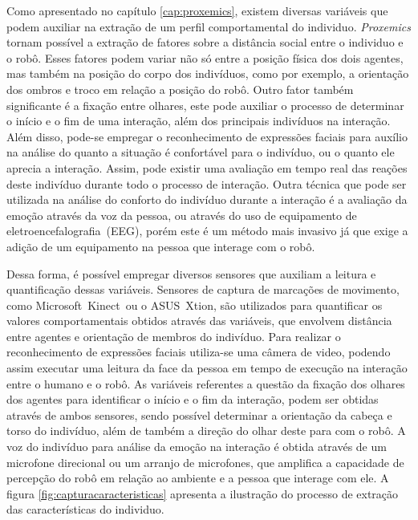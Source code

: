 Como apresentado no capítulo \ref{cap:proxemics}, existem diversas variáveis que podem auxiliar na extração de um perfil comportamental do individuo. \emph{Proxemics} tornam possível a extração de fatores sobre a distância social entre o individuo e o robô. Esses fatores podem variar não só entre a posição física dos dois agentes, mas também na posição do corpo dos indivíduos, como por exemplo, a orientação dos ombros e troco em relação a posição do robô. Outro fator também significante é a fixação entre olhares, este pode auxiliar o processo de determinar o início e o fim de uma interação, além dos principais indivíduos na interação. Além disso, pode-se empregar o reconhecimento de expressões faciais para auxílio na análise do quanto a situação é confortável para o indivíduo, ou o quanto ele aprecia a interação. Assim, pode existir uma avaliação em tempo real das reações deste indivíduo durante todo o processo de interação. Outra técnica que pode ser utilizada na análise do conforto do indivíduo durante a interação é a avaliação da emoção através da voz da pessoa, ou através do uso de equipamento de eletroencefalografia~(EEG), porém este é um método mais invasivo já que exige a adição de um equipamento na pessoa que interage com o robô.

Dessa forma, é possível empregar diversos sensores que auxiliam a leitura e quantificação dessas variáveis. Sensores de captura de marcações de movimento, como Microsoft\textregistered\ Kinect\textregistered\ ou o ASUS\textregistered\ Xtion\textregistered, são utilizados para quantificar os valores comportamentais obtidos através das variáveis, que envolvem distância entre agentes e orientação de membros do indivíduo. Para realizar o reconhecimento de expressões faciais utiliza-se uma câmera de video, podendo assim executar uma leitura da face da pessoa em tempo de execução na interação entre o humano e o robô. As variáveis referentes a questão da fixação dos olhares dos agentes para identificar o início e o fim da interação, podem ser obtidas através de ambos sensores, sendo possível determinar a orientação da cabeça e torso do indivíduo, além de também a direção do olhar deste para com o robô. A voz do indivíduo para análise da emoção na interação é obtida através de um microfone direcional ou um arranjo de microfones, que amplifica a capacidade de percepção do robô em relação ao ambiente e a pessoa que interage com ele. A figura \ref{fig:capturacaracteristicas} apresenta a ilustração do processo de extração das características do individuo.

